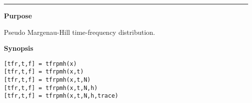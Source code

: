 

\hspace*{-1.6cm}{\Large \bf tfrpmh}

\vspace*{-.4cm}
\hspace*{-1.6cm}\rule[0in]{16.5cm}{.02cm}
\vspace*{.2cm}

{\bf \large {}\selectfont Purpose}\\
\hspace*{1.5cm}
\begin{minipage}[t]{13.5cm}
Pseudo Margenau-Hill time-frequency distribution.
\end{minipage}
\vspace*{.5cm}

{\bf \large {}\selectfont Synopsis}\\
\hspace*{1.5cm}
\begin{minipage}[t]{13.5cm}
\begin{verbatim}
[tfr,t,f] = tfrpmh(x)
[tfr,t,f] = tfrpmh(x,t)
[tfr,t,f] = tfrpmh(x,t,N)
[tfr,t,f] = tfrpmh(x,t,N,h)
[tfr,t,f] = tfrpmh(x,t,N,h,trace)
\end{verbatim}
\end{minipage}
\vspace*{.5cm}

